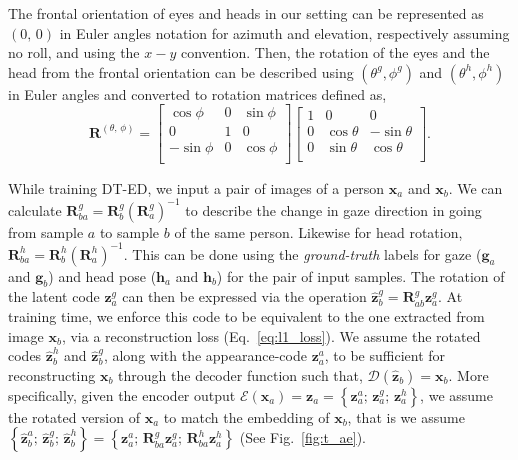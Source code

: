 \documentclass[10pt,twocolumn,letterpaper]{article}
\begin{document}
The frontal orientation of eyes and heads in our setting can be represented as 
$\left(0,\,0\right)$ in Euler angles notation for azimuth and elevation, respectively assuming no roll, and using the $x-y$ convention. Then, the rotation of the eyes and the head from the frontal orientation can be described using $\left(\theta^g,\phi^g\right)$ and $\left(\theta^h,\phi^h\right)$ in Euler angles and converted to rotation matrices defined as,
\begin{equation}
    \mathbf{R}^{\left(\theta,\,\phi\right)}
    = \begin{bmatrix}
        \cos{\phi} & 0 & \sin{\phi} \\
        0 & 1 & 0 \\
        -\sin{\phi} & 0 & \cos{\phi} \\
    \end{bmatrix}
    \begin{bmatrix}
        1 & 0 & 0 \\
        0 & \cos{\theta} & -\sin{\theta} \\
        0 & \sin{\theta} & \cos{\theta} \\
    \end{bmatrix}.
    \label{eq:euler2R}
\end{equation}

While training DT-ED, we input a pair of images of a person $\mathbf{x}_a$ and $\mathbf{x}_b$. We can calculate $\mathbf{R}^g_{ba}=\mathbf{R}^g_b\left(\mathbf{R}^g_a\right)^{-1}$ to describe the change in gaze direction in going from sample $a$ to sample $b$ of the same person.
Likewise for head rotation, $\mathbf{R}^h_{ba}=\mathbf{R}^h_b\left(\mathbf{R}^h_a\right)^{-1}$.
This can be done using the \emph{ground-truth} labels for gaze ($\mathbf{g}_a$ and $\mathbf{g}_b$) and head pose ($\mathbf{h}_a$ and $\mathbf{h}_b$) for the pair of input samples.
The rotation of the latent code $\mathbf{z}^g_a$ can then be expressed via the operation $\hat{\mathbf{z}}^g_b=\mathbf{R}_{ab}^g\mathbf{z}^g_a$.
At training time, we enforce this code to be equivalent to the one extracted from image $\mathbf{x}_b$, via a reconstruction loss (Eq.~\ref{eq:l1_loss}). 
We assume the rotated codes $\hat{\mathbf{z}}^h_b$ and $\hat{\mathbf{z}}^g_b$, along with the appearance-code $\mathbf{z}^a_a$, to be sufficient for reconstructing $\mathbf{x}_b$ through the decoder function such that, $\mathcal{D}\left(\hat{\mathbf{z}}_b\right) = \mathbf{x}_b$. 
More specifically, given the encoder output $\mathcal{E}\left(\mathbf{x}_a\right)=\mathbf{z}_a = \left\{\mathbf{z}^a_a;\,\mathbf{z}^g_a;\,\mathbf{z}^h_a\right\}$, we assume the rotated version of $\mathbf{x}_a$ to match the embedding of $\mathbf{x}_b$, that is we assume $\left\{\hat{\mathbf{z}}^a_b;\,\hat{\mathbf{z}}^g_b;\,\hat{\mathbf{z}}^h_b\right\}=\left\{\mathbf{z}^a_a;\,\mathbf{R}^g_{ba}\mathbf{z}^g_a;\,\mathbf{R}^h_{ba}\mathbf{z}^h_a\right\}$ (See Fig.~\ref{fig:t_ae}).
\end{document}
